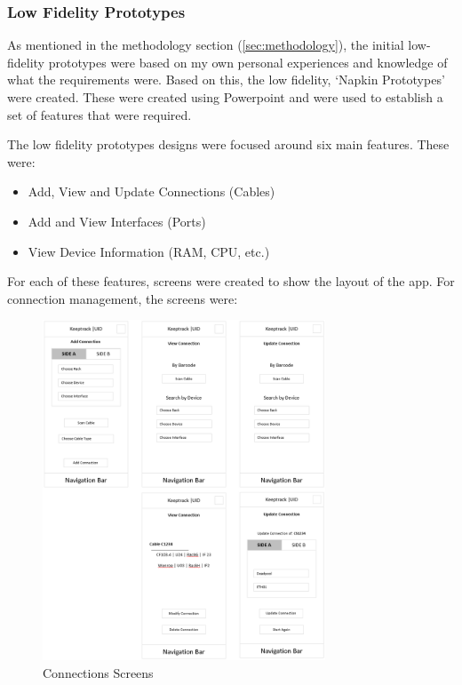 \documentclass [11pt,a4paper]{article}
\begin{document}
\subsubsection{Low Fidelity Prototypes}
\label{sec:ui_design_initial_prototypes}
As mentioned in the methodology section (\ref{sec:methodology}), the initial low-fidelity prototypes were based on my own personal experiences and knowledge of what the requirements were. Based on this, the low fidelity, `Napkin Prototypes' were created. These were created using Powerpoint and were used to establish a set of features that were required. 

The low fidelity prototypes designs were focused around six main features. These were:
\begin{itemize}
    \item Add, View and Update Connections (Cables)
    \item Add and View Interfaces (Ports)
    \item View Device Information (RAM, CPU, etc.)
\end{itemize}

For each of these features, screens were created to show the layout of the app. For connection management, the screens were:

\begin{figure}[H]
    \centering
    \includegraphics[width=0.75\textwidth]{images/initial_prototype_connections.png}
    \caption{Connections Screens}
    \label{fig:low_fidelity_prototypes_connections}
\end{figure}
\end{document}
